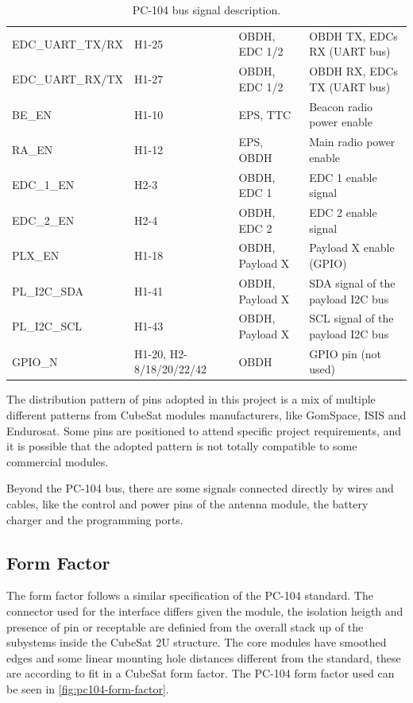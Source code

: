 \begin{table}[!h]
\begin{tabular}{lL{0.18\textwidth}L{0.17\textwidth}L{0.33\textwidth}}
        EDC\_UART\_TX/RX & H1-25           & OBDH, EDC 1/2        & OBDH TX, EDCs RX (UART bus) \\
        EDC\_UART\_RX/TX & H1-27           & OBDH, EDC 1/2        & OBDH RX, EDCs TX (UART bus) \\
        BE\_EN           & H1-10           & EPS, TTC             & Beacon radio power enable \\
        RA\_EN           & H1-12           & EPS, OBDH            & Main radio power enable \\
        EDC\_1\_EN       & H2-3            & OBDH, EDC 1          & EDC 1 enable signal \\
        EDC\_2\_EN       & H2-4            & OBDH, EDC 2          & EDC 2 enable signal \\
        PLX\_EN          & H1-18           & OBDH, Payload X      & Payload X enable (GPIO) \\
        PL\_I2C\_SDA     & H1-41           & OBDH, Payload X      & SDA signal of the payload I2C bus \\
        PL\_I2C\_SCL     & H1-43           & OBDH, Payload X      & SCL signal of the payload I2C bus \\
        GPIO\_N          & H1-20, H2-8/18/20/22/42  & OBDH        & GPIO pin (not used) \\
        \bottomrule[1.5pt]
    \end{tabular}
    \caption{PC-104 bus signal description.}
    \label{tab:pc104-signals}
\end{table}

The distribution pattern of pins adopted in this project is a mix of multiple different patterns from CubeSat modules manufacturers, like GomSpace, ISIS and Endurosat. Some pins are positioned to attend specific project requirements, and it is possible that the adopted pattern is not totally compatible to some commercial modules.

Beyond the PC-104 bus, there are some signals connected directly by wires and cables, like the control and power pins of the antenna module, the battery charger and the programming ports.

\subsection{Form Factor}

The form factor follows a similar specification of the PC-104 standard\cite{pc104-specification}.
The connector used for the interface differs given the module, the isolation heigth and presence of pin or receptable are definied from the overall stack up of the subystems inside the CubeSat 2U structure.
The core modules have smoothed edges and some linear mounting hole distances different from the standard, these are according to fit in a CubeSat form factor.
The PC-104 form factor used can be seen in \autoref{fig:pc104-form-factor}.

